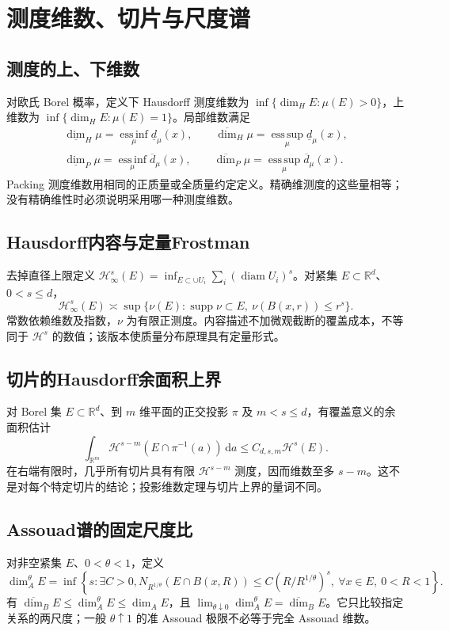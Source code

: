 \documentclass[../main.tex]{subfiles}
\begin{document}
\section{测度维数、切片与尺度谱}
\subsection{测度的上、下维数}
对欧氏 Borel 概率，定义下 Hausdorff 测度维数为 $\inf\{\dim_HE:\mu(E)>0\}$，上维数为 $\inf\{\dim_HE:\mu(E)=1\}$。局部维数满足
\begin{gather*}
\underline{\dim}_H\mu=\operatorname*{ess\,inf}_\mu\underline d_\mu(x),\qquad
\overline{\dim}_H\mu=\operatorname*{ess\,sup}_\mu\underline d_\mu(x),\\
\underline{\dim}_P\mu=\operatorname*{ess\,inf}_\mu\overline d_\mu(x),\qquad
\overline{\dim}_P\mu=\operatorname*{ess\,sup}_\mu\overline d_\mu(x).
\end{gather*}
Packing 测度维数用相同的正质量或全质量约定定义。精确维测度的这些量相等；没有精确维性时必须说明采用哪一种测度维数。
\subsection{Hausdorff内容与定量Frostman}
去掉直径上限定义 $\mathcal H_\infty^s(E)=\inf_{E\subset\cup U_i}\sum_i(\operatorname{diam}U_i)^s$。对紧集 $E\subset\mathbb R^d$、$0<s\le d$，
\[
\mathcal H_\infty^s(E)\asymp
\sup\{\nu(E):\operatorname{supp}\nu\subset E,\ \nu(B(x,r))\le r^s\}.
\]
常数依赖维数及指数，$\nu$ 为有限正测度。内容描述不加微观截断的覆盖成本，不等同于 $\mathcal H^s$ 的数值；该版本使质量分布原理具有定量形式。
\subsection{切片的Hausdorff余面积上界}
对 Borel 集 $E\subset\mathbb R^d$、到 $m$ 维平面的正交投影 $\pi$ 及 $m<s\le d$，有覆盖意义的余面积估计
\[
\int_{\mathbb R^m}\mathcal H^{s-m}(E\cap\pi^{-1}(a))\,\mathrm da
\le C_{d,s,m}\mathcal H^s(E).
\]
在右端有限时，几乎所有切片具有有限 $\mathcal H^{s-m}$ 测度，因而维数至多 $s-m$。这不是对每个特定切片的结论；投影维数定理与切片上界的量词不同。
\subsection{Assouad谱的固定尺度比}
对非空紧集 $E$、$0<\theta<1$，定义
\[
\dim_A^\theta E=\inf\left\{s:\exists C>0,
N_{R^{1/\theta}}(E\cap B(x,R))\le C(R/R^{1/\theta})^s,
\ \forall x\in E,\ 0<R<1\right\}.
\]
有 $\overline{\dim}_BE\le\dim_A^\theta E\le\dim_AE$，且 $\lim_{\theta\downarrow0}\dim_A^\theta E=\overline{\dim}_BE$。它只比较指定关系的两尺度；一般 $\theta\uparrow1$ 的准 Assouad 极限不必等于完全 Assouad 维数。
\end{document}

